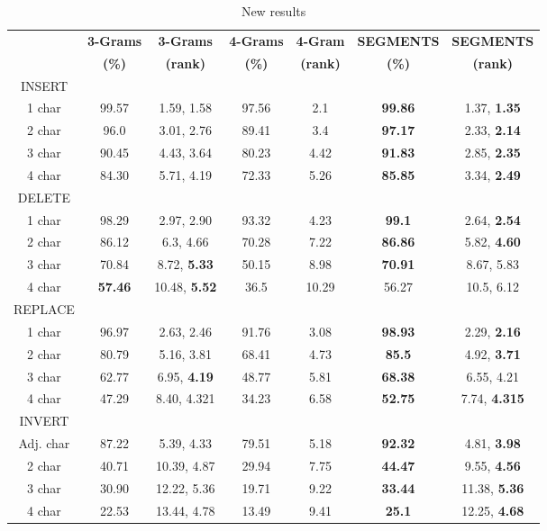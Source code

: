 \documentclass{endm}
\begin{document}
\begin{CJK}{UTF8}{song}
\begin{table}
	\caption{New results}
	\centering
	\begin{tabular}{|c|c|c|c|c|c|c|}
		\hline
		 & \textbf{3-Grams} & \textbf{3-Grams} & \textbf{4-Grams} & \textbf{4-Gram} & \textbf{SEGMENTS} & \textbf{SEGMENTS}\\
		 & \textbf{(\%)} & \textbf{(rank)} & \textbf{(\%)} & \textbf{(rank)} & \textbf{(\%)} & \textbf{(rank)} \\
		\hline
		INSERT & & & & & & \\
		\hline
		1 char & 99.57 & 1.59, 1.58 & 97.56 & 2.1 & \textbf{99.86} & 1.37, \textbf{1.35} \\
		\hline
		2 char & 96.0 & 3.01, 2.76 & 89.41 & 3.4 & \textbf{97.17} & 2.33, \textbf{2.14} \\
		\hline
		3 char & 90.45 & 4.43, 3.64 & 80.23 & 4.42 & \textbf{91.83} & 2.85, \textbf{2.35} \\
		\hline
		4 char & 84.30 & 5.71, 4.19 & 72.33 & 5.26 & \textbf{85.85} & 3.34, \textbf{2.49} \\
		\hline
		DELETE & & & & & & \\
		\hline
		1 char & 98.29 & 2.97, 2.90 & 93.32 & 4.23 & \textbf{99.1} & 2.64, \textbf{2.54} \\
		\hline
		2 char & 86.12 & 6.3, 4.66 & 70.28 & 7.22 & \textbf{86.86} & 5.82, \textbf{4.60} \\
		\hline
		3 char & 70.84 & 8.72, \textbf{5.33} & 50.15 & 8.98 & \textbf{70.91} & 8.67, 5.83 \\
		\hline
		4 char & \textbf{57.46} & 10.48, \textbf{5.52} & 36.5 & 10.29 & 56.27 & 10.5, 6.12 \\
		\hline
		REPLACE & & & & & & \\
		\hline
		1 char & 96.97 & 2.63, 2.46 & 91.76 & 3.08 & \textbf{98.93} & 2.29, \textbf{2.16} \\
		\hline
		2 char & 80.79 & 5.16, 3.81 & 68.41 & 4.73 & \textbf{85.5} & 4.92, \textbf{3.71} \\
		\hline
		3 char & 62.77 & 6.95, \textbf{4.19} & 48.77 & 5.81 & \textbf{68.38} & 6.55, 4.21 \\
		\hline
		4 char & 47.29 & 8.40, 4.321 & 34.23 & 6.58 & \textbf{52.75} & 7.74, \textbf{4.315} \\
		\hline
		INVERT & & & & & & \\
		\hline
		Adj. char & 87.22 & 5.39, 4.33 & 79.51 & 5.18 & \textbf{92.32} & 4.81, \textbf{3.98} \\
		\hline
		2 char & 40.71 & 10.39, 4.87 & 29.94 & 7.75 & \textbf{44.47} & 9.55, \textbf{4.56} \\
		\hline
		3 char & 30.90 & 12.22, 5.36 & 19.71 & 9.22 & \textbf{33.44} & 11.38, \textbf{5.36} \\
		\hline
		4 char & 22.53 & 13.44, 4.78 & 13.49 & 9.41 & \textbf{25.1} & 12.25, \textbf{4.68} \\
		\hline
	\end{tabular}
	\label{tab:new_result}
\end{table}



\end{CJK}
\end{document}
